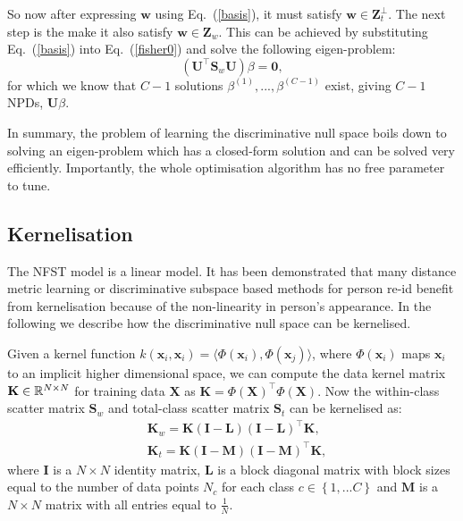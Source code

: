 \documentclass[10pt,twocolumn,letterpaper]{article}
\begin{document}
So now after expressing $\mathbf{w}$ using Eq.~(\ref{basis}), it must satisfy $\mathbf{w}  \in \mathbf{Z}_{t}^{\perp}$. The next step is the make it also satisfy $\mathbf{w}  \in \mathbf{Z}_{w}$. This can be achieved by substituting Eq.~(\ref{basis}) into Eq.~(\ref{fisher0}) and solve the following  eigen-problem:
\begin{equation}\label{solution} 
(\mathbf{U}^{\top}\mathbf{S}_{w}\mathbf{U})\beta = \mathbf{0},
\end{equation}
for which we know that $C-1$ solutions $\beta ^{(1)},...,\beta ^{(C-1)}$ exist, giving $C-1$ NPDs, $\mathbf{U}\beta$. 

In summary, the problem of learning the discriminative null space boils down to solving an eigen-problem which has a closed-form solution and can be solved very efficiently. Importantly, the whole optimisation algorithm has no free parameter to tune.

\subsection{Kernelisation}
The NFST model is a linear model. It has been demonstrated \cite{xiong2014person} that many distance metric learning or discriminative subspace based methods for person re-id benefit from kernelisation because of the non-linearity in person's appearance. In the following we describe how the discriminative null space can be kernelised. 

Given a kernel function $k(\mathbf{x}_i,\mathbf{x}_i) = \langle \Phi(\mathbf{x}_i),\Phi(\mathbf{x}_j)\rangle$, where $\Phi(\mathbf{x}_i)$ maps $\mathbf{x}_i$ to an implicit higher dimensional space, we can compute the data kernel matrix $\mathbf{K} \in \Bbb{R}^{N \times N}$ for training data $\mathbf{X}$  as $\mathbf{K} =  \Phi(\mathbf{X})^{\top} \Phi(\mathbf{X})$.
Now the  within-class scatter matrix $\mathbf{S}_{w}$ and total-class scatter matrix $\mathbf{S}_{t}$ can be kernelised as:
\begin{align*}
&\mathbf{K}_{w} = \mathbf{K}(\mathbf{I}-\mathbf{L})(\mathbf{I}-\mathbf{L})^{\top}\mathbf{K}, \\
&\mathbf{K}_{t} = \mathbf{K}(\mathbf{I}-\mathbf{M})(\mathbf{I}-\mathbf{M})^{\top}\mathbf{K},
\end{align*}
where $\mathbf{I}$ is a $N \times N$ identity matrix, $\mathbf{L}$ is a block diagonal matrix with block sizes equal to the number of data points $N_{c}$ for each class $c \in \left \{ 1,...C \right \}$ and $\mathbf{M}$ is a $N \times N$ matrix with all entries equal to $\frac{1}{N}$.
\end{document}
